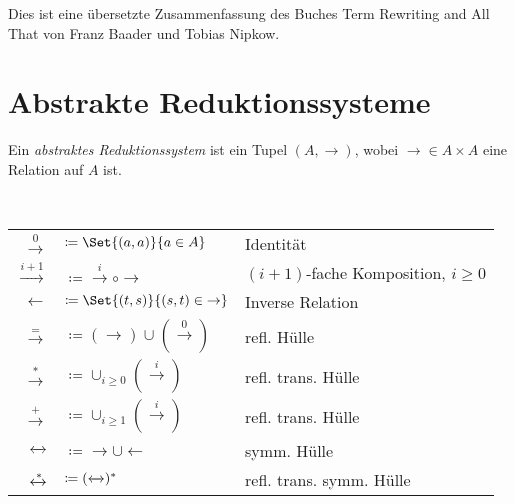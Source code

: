 \documentclass{cheat-sheet}
\newcommand{\from}{\leftarrow}
\newcommand{\reducesTo}{\xrightarrow{*}}
\newcommand{\strictlyReducesTo}{\xrightarrow{+}}
\newcommand{\toOrEq}{\xrightarrow{=}}
\newcommand{\zzEq}{\xleftrightarrow{*}} %
\begin{document}
\raggedcolumns %


Dies ist eine übersetzte Zusammenfassung des Buches Term Rewriting and All That von Franz Baader und Tobias Nipkow.

\section{Abstrakte Reduktionssysteme}

\begin{defn}
  Ein \emph{abstraktes Reduktionssystem} ist ein Tupel $(A, {\to})$, wobei ${\to} \in A \times A$ eine Relation auf $A$ ist.
\end{defn}


\begin{defn}
  \,
  \begin{minipage}[t]{0.88 \linewidth}
    \begin{tabular}[t]{ r l l }
      $\xrightarrow{0}$ & $\coloneqq \Set{(a, a)}{a \in A}$ & Identität \\
      $\xrightarrow{i+1}$ & $\coloneqq {\xrightarrow{i}} \circ {\to}$ & $(i+1)$-fache Komposition, $i \geq 0$ \\
      $\from$ & $\coloneqq \Set{(t, s)}{(s, t) \in {\to}}$ & Inverse Relation \\
      $\toOrEq$ & $\coloneqq (\to) \cup (\xrightarrow{0})$ & refl. Hülle \\
      $\reducesTo$ & $\coloneqq \cup_{i \geq 0} (\xrightarrow{i})$ & refl. trans. Hülle \\
      $\strictlyReducesTo$ & $\coloneqq \cup_{i \geq 1} (\xrightarrow{i})$ & refl. trans. Hülle \\
      $\xleftrightarrow{}$ & $\coloneqq {\to} \cup {\from}$ & symm. Hülle \\
      $\zzEq$ & $\coloneqq (\xleftrightarrow{})^{*}$ & refl. trans. symm. Hülle
    \end{tabular}
  \end{minipage}
\end{defn}
\end{document}
